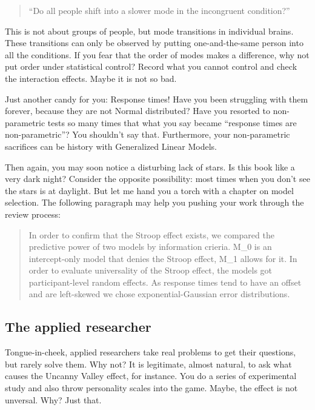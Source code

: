 \documentclass[]{svmono}
\theoremstyle{definition}
\theoremstyle{definition}
\theoremstyle{definition}
\theoremstyle{remark}
\begin{document}
\begin{quote}
``Do all people shift into a slower mode in the incongruent condition?''
\end{quote}

This is not about groups of people, but mode transitions in individual
brains. These transitions can only be observed by putting
one-and-the-same person into all the conditions. If you fear that the
order of modes makes a difference, why not put order under statistical
control? Record what you cannot control and check the interaction
effects. Maybe it is not so bad.

Just another candy for you: Response times! Have you been struggling
with them forever, because they are not Normal distributed? Have you
resorted to non-parametric tests so many times that what you say became
``response times are non-parametric''? You shouldn't say that.
Furthermore, your non-parametric sacrifices can be history with
Generalized Linear Models.

Then again, you may soon notice a disturbing lack of stars. Is this book
like a very dark night? Consider the opposite possibility: most times
when you don't see the stars is at daylight. But let me hand you a torch
with a chapter on model selection. The following paragraph may help you
pushing your work through the review process:

\begin{quote}
In order to confirm that the Stroop effect exists, we compared the
predictive power of two models by information crieria. M\_0 is an
intercept-only model that denies the Stroop effect, M\_1 allows for it.
In order to evaluate universality of the Stroop effect, the models got
participant-level random effects. As response times tend to have an
offset and are left-skewed we chose exponential-Gaussian error
distributions.
\end{quote}

\subsection{The applied researcher}\label{the-applied-researcher}

Tongue-in-cheek, applied researchers take real problems to get their
questions, but rarely solve them. Why not? It is legitimate, almost
natural, to ask what causes the Uncanny Valley effect, for instance. You
do a series of experimental study and also throw personality scales into
the game. Maybe, the effect is not unversal. Why? Just that.
\end{document}
